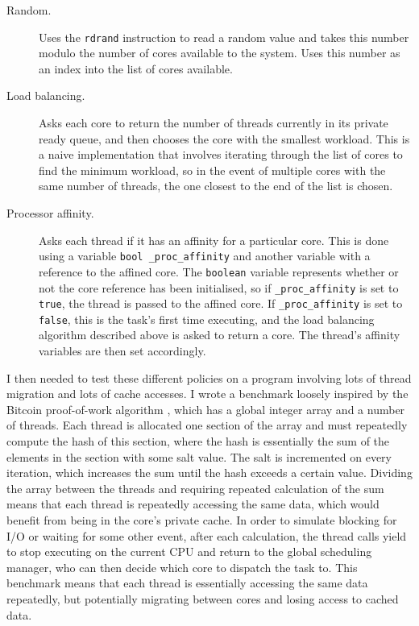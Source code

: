 \documentclass[bsc,frontabs,twoside,singlespacing,parskip,deptreport]{infthesis}     %
\begin{document}
\begin{description}
\item[Random.] Uses the \verb|rdrand| instruction to read a random value and takes this number modulo the number of cores available to the system. Uses this number as an index into the list of cores available.
\item[Load balancing.] Asks each core to return the number of threads currently in its private ready queue, and then chooses the core with the smallest workload. This is a naive implementation that involves iterating through the list of cores to find the minimum workload, so in the event of multiple cores with the same number of threads, the one closest to the end of the list is chosen. 
\item[Processor affinity.] Asks each thread if it has an affinity for a particular core. This is done using a variable \verb|bool _proc_affinity| and another variable with a reference to the affined core. The \verb|boolean| variable represents whether or not the core reference has been initialised, so if \verb|_proc_affinity| is set to \verb|true|, the thread is passed to the affined core. If \verb|_proc_affinity| is set to \verb|false|, this is the task's first time executing, and the load balancing algorithm described above is asked to return a core. The thread's affinity variables are then set accordingly.
\end{description}

I then needed to test these different policies on a program involving lots of thread migration and lots of cache accesses. I wrote a benchmark loosely inspired by the Bitcoin proof-of-work algorithm \cite{proof-of-work}, which has a global integer array and a number of threads. Each thread is allocated one section of the array and must repeatedly compute the hash of this section, where the hash is essentially the sum of the elements in the section with some salt value. The salt is incremented on every iteration, which increases the sum until the hash exceeds a certain value. Dividing the array between the threads and requiring repeated calculation of the sum means that each thread is repeatedly accessing the same data, which would benefit from being in the core's private cache. In order to simulate blocking for I/O or waiting for some other event, after each calculation, the thread calls yield to stop executing on the current CPU and return to the global scheduling manager, who can then decide which core to dispatch the task to. This benchmark means that each thread is essentially accessing the same data repeatedly, but potentially migrating between cores and losing access to cached data. \\
\end{document}
